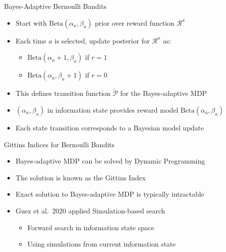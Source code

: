 \begin{frame}{Bayes-Adaptive Bernoulli Bandits}
\begin{itemize}
    \item Start with $\mathrm{Beta}(\alpha_a, \beta_a)$ prior over reward function $\mathcal{R}^a$
    \item Each time $a$ is selected, update posterior for $\mathcal{R}^a$ as:
    \begin{itemize}
        \item $\mathrm{Beta}(\alpha_a + 1, \beta_a)$ if $r = 1$
        \item $\mathrm{Beta}(\alpha_a, \beta_a + 1)$ if $r = 0$
    \end{itemize}
    \item This defines transition function $\tilde{\mathcal{P}}$ for the Bayes-adaptive MDP
    \item $(\alpha_a, \beta_a)$ in information state provides reward model $\mathrm{Beta}(\alpha_a, \beta_a)$
    \item Each state transition corresponds to a Bayesian model update
\end{itemize}
\end{frame}

\begin{frame}{Gittins Indices for Bernoulli Bandits}
\begin{itemize}
    \item Bayes-adaptive MDP can be solved by Dynamic Programming
    \item The solution is known as the Gittins Index
    \item Exact solution to Bayes-adaptive MDP is typically intractable
    \item Guez et al.\ 2020 applied Simulation-based search
    \begin{itemize}
        \item Forward search in information state space
        \item Using simulations from current information state
    \end{itemize}
\end{itemize}
\end{frame}
